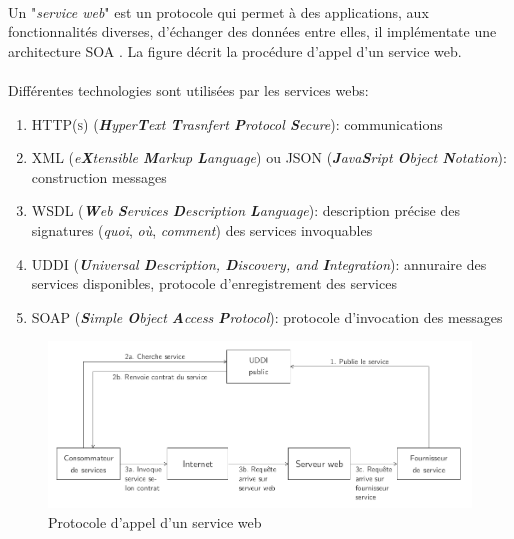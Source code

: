 {\paragraph{}
Un "\textit{service web}" est un protocole qui permet à des applications, aux fonctionnalités diverses, d'échanger des données entre elles, il implémentate une architecture SOA . La figure \cite{appel-service-web} décrit la procédure d'appel d'un service web.
\paragraph{}
Différentes technologies sont utilisées par les services webs:
\begin{enumerate}
\item \textcolor{ltred}{\textsc{HTTP(s)}} (\textit{\textbf{H}yper\textbf{T}ext \textbf{T}rasnfert \textbf{P}rotocol \textbf{S}ecure}): communications
\item \textcolor{ltred}{\textsc{XML}} (\textit{e\textbf{X}tensible \textbf{M}arkup \textbf{L}anguage}) ou \textcolor{ltred}{\textsc{JSON}} (\textit{\textbf{J}ava\textbf{S}ript \textbf{O}bject \textbf{N}otation}): construction messages
\item \textcolor{ltred}{\textsc{WSDL}} (\textit{\textbf{W}eb \textbf{S}ervices \textbf{D}escription \textbf{L}anguage}): description précise des signatures (\textit{quoi}, \textit{où}, \textit{comment}) des services invoquables
\item \textcolor{ltred}{\textsc{UDDI}} (\textit{\textbf{U}niversal \textbf{D}escription, \textbf{D}iscovery, and \textbf{I}ntegration}): annuraire des services disponibles, protocole d'enregistrement des services
\item \textcolor{ltred}{\textsc{SOAP}} (\textit{\textbf{S}imple \textbf{O}bject \textbf{A}ccess \textbf{P}rotocol}): protocole d'invocation des messages
\end{enumerate}

\begin{figure}[h!]
\center\includegraphics[scale=.4]{images/services-web}
\caption{Protocole d'appel d'un service web \cite{ref1}}
\label{appel-service-web}
\end{figure}

}
